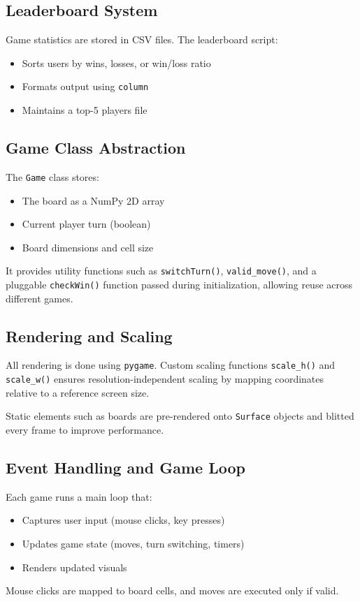 \documentclass[12pt]{article}
\begin{document}
\subsection{Leaderboard System}
Game statistics are stored in CSV files. The leaderboard script:
\begin{itemize}
    \item Sorts users by wins, losses, or win/loss ratio
    \item Formats output using \texttt{column}
    \item Maintains a top-5 players file
\end{itemize}


\subsection{Game Class Abstraction}
The \texttt{Game} class stores:
\begin{itemize}
    \item The board as a NumPy 2D array
    \item Current player turn (boolean)
    \item Board dimensions and cell size
\end{itemize}
It provides utility functions such as \texttt{switchTurn()}, \texttt{valid\_move()}, and a pluggable \texttt{checkWin()} function passed during initialization, allowing reuse across different games.

\subsection{Rendering and Scaling}
All rendering is done using \texttt{pygame}. Custom scaling functions \texttt{scale\_h()} and \texttt{scale\_w()} ensures resolution-independent scaling by mapping coordinates relative to a reference screen size.

Static elements such as boards are pre-rendered onto \texttt{Surface} objects and blitted every frame to improve performance.

\subsection{Event Handling and Game Loop}
Each game runs a main loop that:
\begin{itemize}
    \item Captures user input (mouse clicks, key presses)
    \item Updates game state (moves, turn switching, timers)
    \item Renders updated visuals
\end{itemize}
Mouse clicks are mapped to board cells, and moves are executed only if valid.
\end{document}
